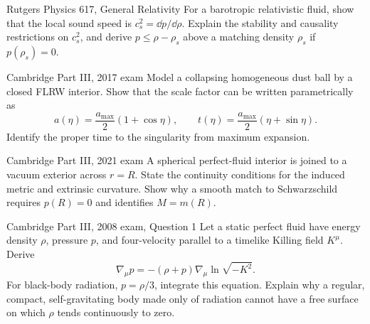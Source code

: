 \begin{exercises}
\begin{exercise}{Rutgers Physics 617, General Relativity}
For a barotropic relativistic fluid, show that the local sound speed is
\(c_s^2=\dd p/\dd\rho\).  Explain the stability and causality restrictions on
\(c_s^2\), and derive \(p\leq\rho-\rho_s\) above a matching density
\(\rho_s\) if \(p(\rho_s)=0\).
\end{exercise}

\begin{exercise}{Cambridge Part III, 2017 exam}
Model a collapsing homogeneous dust ball by a closed FLRW interior.  Show that
the scale factor can be written parametrically as
\[
a(\eta)=\frac{a_{\max}}2(1+\cos\eta),\qquad
t(\eta)=\frac{a_{\max}}2(\eta+\sin\eta).
\]
Identify the proper time to the singularity from maximum expansion.
\end{exercise}

\begin{exercise}{Cambridge Part III, 2021 exam}
A spherical perfect-fluid interior is joined to a vacuum exterior across
\(r=R\).  State the continuity conditions for the induced metric and
extrinsic curvature.  Show why a smooth match to Schwarzschild requires
\(p(R)=0\) and identifies \(M=m(R)\).
\end{exercise}

\begin{exercise}{Cambridge Part III, 2008 exam, Question 1}
Let a static perfect fluid have energy density \(\rho\), pressure \(p\), and
four-velocity parallel to a timelike Killing field \(K^\mu\).  Derive
\[
\nabla_\mu p
=-(\rho+p)\nabla_\mu\ln\sqrt{-K^2}.
\]
For black-body radiation, \(p=\rho/3\), integrate this equation.  Explain why
a regular, compact, self-gravitating body made only of radiation cannot have
a free surface on which \(\rho\) tends continuously to zero.
\end{exercise}



\end{exercises}

